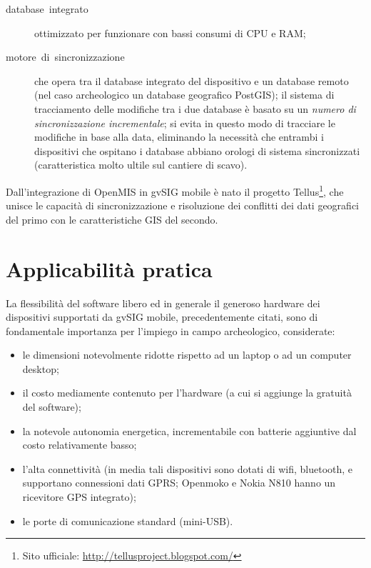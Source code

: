\documentclass{paper}
\begin{document}
\begin{description}

	\item [{database~integrato}] ottimizzato per funzionare con bassi consumi
	di CPU e RAM;

	\item [{motore~di~sincronizzazione}] che opera tra il database integrato
	del dispositivo e un database remoto (nel caso archeologico un database
	geografico PostGIS); il sistema di tracciamento delle modifiche tra
	i due database è basato su un \emph{numero di sincronizzazione incrementale};
	si evita in questo modo di tracciare le modifiche in base alla data,
	eliminando la necessit\`{a} che entrambi i dispositivi che ospitano i
	database abbiano orologi di sistema sincronizzati (caratteristica
	molto ultile sul cantiere di scavo).

\end{description}

	Dall'integrazione di OpenMIS in gvSIG mobile \`{e} nato il progetto Tellus\footnote{Sito ufficiale: \href{http://tellusproject.blogspot.com/}{http://tellusproject.blogspot.com/}}, che unisce le capacit\`{a} di sincronizzazione e risoluzione dei conflitti
	dei dati geografici del primo con le caratteristiche GIS del secondo.

\section{Applicabilità pratica}

	La flessibilit\`{a} del software libero ed in generale il generoso hardware
	dei dispositivi supportati da gvSIG mobile, precedentemente citati,
	sono di fondamentale importanza per l'impiego in campo archeologico,
	considerate:

	\begin{itemize}
		\item le dimensioni notevolmente ridotte rispetto ad un laptop o ad un computer
			desktop;
		\item il costo mediamente contenuto per l'hardware (a cui si aggiunge la
		  	gratuit\`{a} del software);
		\item la notevole autonomia energetica, incrementabile con batterie aggiuntive
			dal costo relativamente basso;
		\item l'alta connettivit\`{a} (in media tali dispositivi sono dotati di wifi,
			bluetooth, e supportano connessioni dati GPRS; Openmoko e Nokia N810
			hanno un ricevitore GPS integrato);
		\item le porte di comunicazione standard (mini-USB).
	\end{itemize}
	
\end{document}
